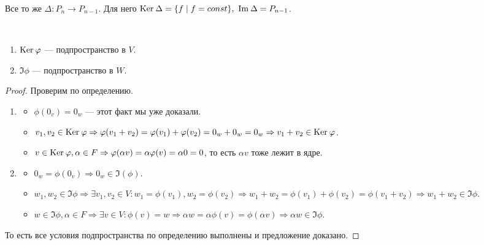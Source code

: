 \begin{Examples}
Все то же $\Delta: P_n \rightarrow P_{n-1}$. Для него $\mathrm{Ker}\: \Delta = \{f \mid f = const\},\  \mathrm{Im\:} \Delta = P_{n-1}$.
\end{Examples}

\begin{Suggestion}\
	\begin{enumerate}
		\item $\mathrm{Ker}\: \varphi$ --- подпространство в $V$.
		\item $\Im \phi$ --- подпространство в $W$.
		
	\end{enumerate}
\end{Suggestion}

\begin{proof}
    Проверим по определению.
    \begin{enumerate}
        \item \begin{itemize}
            \item $\phi(0_v) = 0_w$ --- этот факт мы уже доказали.
            \item $v_1, v_2 \in \mathrm{Ker}\: \varphi \Rightarrow \varphi(v_1+v_2) = \varphi(v_1) + \varphi(v_2) = 0_w + 0_w = 0_w \Rightarrow v_1+v_2 \in \mathrm{Ker}\: \varphi$.
            \item $v \in \mathrm{Ker}\: \varphi, \alpha \in F \Rightarrow \varphi(\alpha v) = \alpha \varphi(v) = \alpha 0 = 0$, то есть $\alpha v$ тоже лежит в ядре.
        \end{itemize}
        \item \begin{itemize}
            \item $0_w = \phi(0_v) \Rightarrow 0_w \in \Im(\phi)$.
            \item $w_1, w_2 \in \Im \phi \Rightarrow \exists v_1, v_2 \in V\colon w_1 = \phi(v_1), w_2 = \phi(v_2) \Rightarrow w_1 + w_2 = \phi(v_1) + \phi(v_2) = \phi(v_1 + v_2) \Rightarrow w_1 + w_2 \in \Im \phi$.
            \item $w \in \Im \phi, \alpha \in F \Rightarrow \exists v \in V \colon \phi(v) = w \Rightarrow \alpha w = \alpha \phi(v) = \phi(\alpha v) \Rightarrow \alpha w \in \Im \phi$.
            
        \end{itemize}
    \end{enumerate}
    То есть все условия подпространства по определению выполнены и предложение доказано.
\end{proof}

